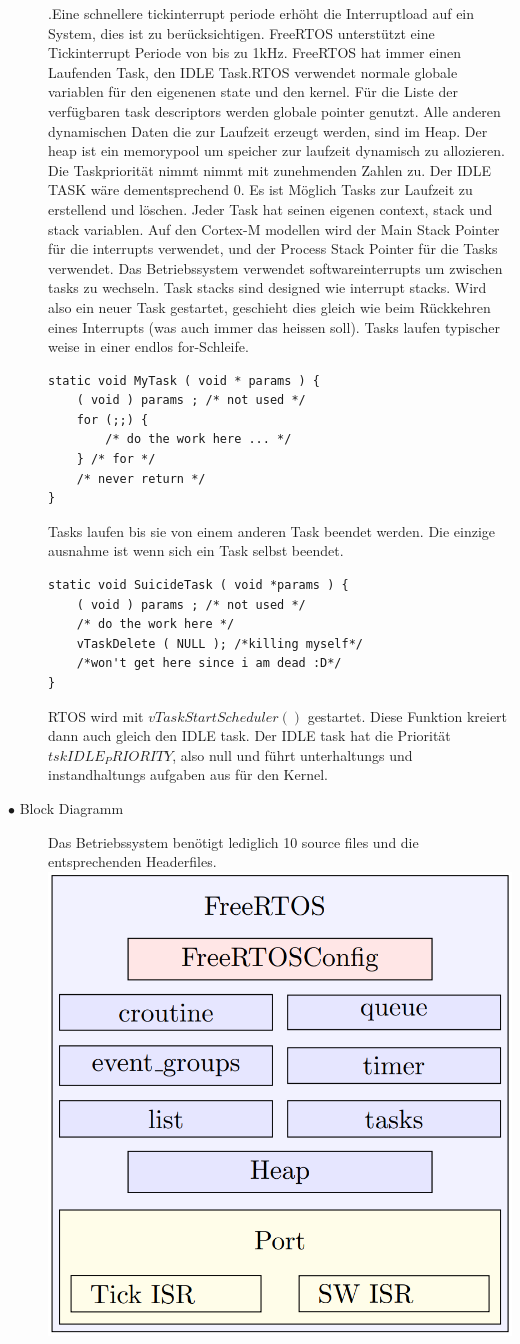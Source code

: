 \documentclass[a4paper, 8pt]{extarticle}
\begin{document}
\begin{multicols*}{3}
\begin{description}
						.Eine  schnellere tickinterrupt periode erhöht die Interruptload auf ein System, dies ist zu berücksichtigen. FreeRTOS unterstützt eine Tickinterrupt Periode
						von bis zu 1kHz. FreeRTOS hat immer einen Laufenden Task, den IDLE Task.RTOS verwendet normale globale variablen für den eigenenen 
						state und den kernel. Für die Liste der verfügbaren task descriptors werden globale pointer genutzt. Alle anderen dynamischen Daten die zur Laufzeit erzeugt 
						werden, sind im Heap. Der heap ist ein memorypool um speicher zur laufzeit dynamisch zu allozieren. Die Taskpriorität nimmt nimmt mit zunehmenden Zahlen zu. Der IDLE
						TASK wäre dementsprechend 0. Es ist Möglich Tasks zur Laufzeit zu erstellend und löschen. Jeder Task hat seinen eigenen context, stack und stack variablen.
						Auf den Cortex-M modellen wird der Main Stack Pointer für die interrupts verwendet, und der Process Stack Pointer für die Tasks verwendet. Das Betriebssystem
						verwendet softwareinterrupts um zwischen tasks zu wechseln. Task stacks sind designed wie interrupt stacks. Wird also ein neuer Task gestartet, geschieht dies gleich
						wie beim Rückkehren eines Interrupts (was auch immer das heissen soll). Tasks laufen typischer weise in einer endlos for-Schleife.
							\begin{lstlisting}
static void MyTask ( void * params ) {
	( void ) params ; /* not used */
	for (;;) {
		/* do the work here ... */
	} /* for */
	/* never return */
}
							\end{lstlisting} 
						Tasks laufen bis sie von einem anderen Task beendet werden. Die einzige ausnahme ist wenn sich ein Task selbst beendet.
							\begin{lstlisting}
static void SuicideTask ( void *params ) {
	( void ) params ; /* not used */
	/* do the work here */
	vTaskDelete ( NULL ); /*killing myself*/
	/*won't get here since i am dead :D*/
}
							\end{lstlisting} 
						RTOS wird mit $vTaskStartScheduler()$ gestartet. Diese Funktion kreiert dann auch gleich den IDLE task. Der IDLE task hat die Priorität $tskIDLE_PRIORITY$,
						also null und führt unterhaltungs und instandhaltungs aufgaben aus für den Kernel.
					\item[$\bullet$ Block Diagramm]
						Das Betriebssystem benötigt lediglich 10 source files und die entsprechenden Headerfiles.
						\includegraphics[width=0.6\linewidth,left]{img/FreeRTOS_Achitecture.PNG}			

\end{description}
\end{multicols*}
\end{document}

